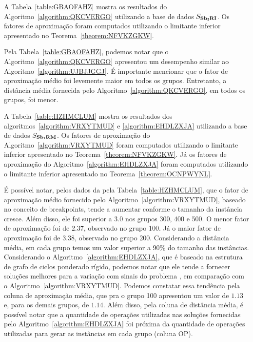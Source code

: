 A Tabela~\ref{table:GBAOFAHZ} mostra os resultados do Algoritmo~\ref{algorithm:QKCVERGO} utilizando a base de dados $S_{\textbf{Sb\textsubscript{I}RI}}{}$. Os fatores de aproximação foram computados utilizando o limitante inferior apresentado no Teorema~\ref{theorem:NFVKZGKW}.



Pela Tabela~\ref{table:GBAOFAHZ}, podemos notar que o Algoritmo~\ref{algorithm:QKCVERGO} apresentou um desempenho similar ao Algoritmo~\ref{algorithm:UJBJJGGJ}. É importante mencionar que o fator de aproximação médio foi levemente maior em todos os grupos. Entretanto, a distância média fornecida pelo Algoritmo~\ref{algorithm:QKCVERGO}, em todos os grupos, foi menor. 

A Tabela~\ref{table:HZHMCLUM} mostra os resultados dos algoritmos~\ref{algorithm:VRXYTMUD} e \ref{algorithm:EHDLZXJA} utilizando a base de dados $S_{\textbf{Sb\textsubscript{I}RM}}{}$. Os fatores de aproximação do Algoritmo~\ref{algorithm:VRXYTMUD} foram computados utilizando o limitante inferior apresentado no Teorema~\ref{theorem:NFVKZGKW}. Já os fatores de aproximação do Algoritmo~\ref{algorithm:EHDLZXJA} foram computados utilizando o limitante inferior apresentado no Teorema~\ref{theorem:OCNPWYNL}.



É possível notar, pelos dados da pela Tabela~\ref{table:HZHMCLUM}, que o fator de aproximação médio fornecido pelo Algoritmo~\ref{algorithm:VRXYTMUD}, baseado no conceito de breakpoints, tende a aumentar conforme o tamanho da instância cresce. Além disso, ele foi superior a $3.0$ nos grupos 300, 400 e 500. O menor fator de aproximação foi de $2.37$, observado no grupo 100. Já o maior fator de aproximação foi de $3.38$, observado no grupo 200. Considerando a distância média, em cada grupo temos um valor superior a 90\% do tamanho das instâncias. Considerando o Algoritmo~\ref{algorithm:EHDLZXJA}, que é baseado na estrutura de grafo de ciclos ponderado rígido, podemos notar que ele tende a fornecer soluções melhores para a variação com sinais do problema \SbIRM{}, em comparação com o Algoritmo~\ref{algorithm:VRXYTMUD}. Podemos constatar essa tendência pela coluna de aproximação média, que pra o grupo 100 apresentou um valor de $1.13$ e, para os demais grupos, de $1.14$. Além disso, pela coluna de distância média, é possível notar que a quantidade de operações utilizadas nas soluções fornecidas pelo Algoritmo~\ref{algorithm:EHDLZXJA} foi próxima da quantidade de operações utilizadas para gerar as instâncias em cada grupo (coluna OP).

